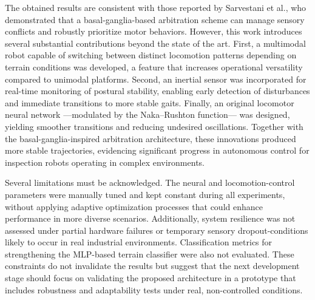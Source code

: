 \documentclass[preprint,12pt]{elsarticle}
\begin{document}
The obtained results are consistent with those reported by Sarvestani et al., who demonstrated that a basal-ganglia-based arbitration scheme can manage sensory conflicts and robustly prioritize motor behaviors. However, this work introduces several substantial contributions beyond the state of the art. First, a multimodal robot capable of switching between distinct locomotion patterns depending on terrain conditions was developed, a feature that increases operational versatility compared to unimodal platforms. Second, an inertial sensor was incorporated for real-time monitoring of postural stability, enabling early detection of disturbances and immediate transitions to more stable gaits. Finally, an original locomotor neural network ---modulated by the Naka–Rushton function--- was designed, yielding smoother transitions and reducing undesired oscillations. Together with the basal-ganglia-inspired arbitration architecture, these innovations produced more stable trajectories, evidencing significant progress in autonomous control for inspection robots operating in complex environments. 

Several limitations must be acknowledged. The neural and locomotion-control parameters were manually tuned and kept constant during all experiments, without applying adaptive optimization processes that could enhance performance in more diverse scenarios. Additionally, system resilience was not assessed under partial hardware failures or temporary sensory dropout-conditions likely to occur in real industrial environments. Classification metrics for strengthening the MLP-based terrain classifier were also not evaluated. These constraints do not invalidate the results but suggest that the next development stage should focus on validating the proposed architecture in a prototype that includes robustness and adaptability tests under real, non-controlled conditions.
\end{document}
